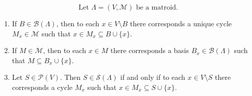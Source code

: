$$
\text{Let }\Lambda = (V, \mathcal{M})\text{ be a matroid.}
$$

\begin{enumerate}
\item[(a)] If $B \in \mathcal{B}(\Lambda)$, then to each $x \in V \setminus B$ there corresponds a unique cycle $M_x \in \mathcal{M}$ such that $x \in M_x \subseteq B \cup \{x\}$.

\item[(b)] If $M \in \mathcal{M}$, then to each $x \in M$ there corresponds a basis $B_x \in \mathcal{B}(\Lambda)$ such that $M \subseteq B_x \cup \{x\}$.

\item[(c)] Let $S \in \mathcal{P}(V)$. Then $S \in \mathcal{S}(\Lambda)$ if and only if to each $x \in V \setminus S$ there corresponds a cycle $M_x$ such that $x \in M_x \subseteq S \cup \{x\}$.
\end{enumerate}
